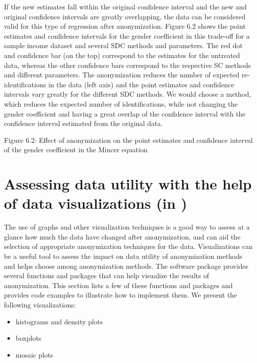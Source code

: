\documentclass[letterpaper,10pt,english]{sphinxmanual}
\begin{document}
If the new estimates fall within the original confidence interval and
the new and original confidence intervals are greatly overlapping, the
data can be considered valid for this type of regression after
anonymization. Figure 6.2 shows the point estimates and confidence
intervals for the gender coefficient in this trade-off for a sample
income dataset and several SDC methods and parameters. The red dot and
confidence bar (on the top) correspond to the estimates for the
untreated data, whereas the other confidence bars correspond to the
respective SC methods and different parameters. The anonymization
reduces the number of expected re-identifications in the data (left
axis) and the point estimates and confidence intervals vary greatly for
the different SDC methods. We would choose a method, which reduces the
expected number of identifications, while not changing the gender
coefficient and having a great overlap of the confidence interval with
the confidence interval estimated from the original data.

\noindent{}

Figure 6.2: Effect of anonymization on the point estimates and
confidence interval of the gender coefficient in the Mincer equation


\section{Assessing data utility with the help of data visualizations (in )}
\label{\detokenize{utility:assessing-data-utility-with-the-help-of-data-visualizations-in-r}}
The use of graphs and other visualization techniques is a good way to
assess at a glance how much the data have changed after anonymization,
and can aid the selection of appropriate anonymization techniques for
the data. Visualizations can be a useful tool to assess the impact on
data utility of anonymization methods and helps choose among
anonymization methods. The software package  provides several
functions and packages that can help visualize the results of
anonymization. This section lists a few of these functions and packages
and provides code examples to illustrate how to implement them. We
present the following visualizations:
\begin{itemize}
\item {} 
histograms and density plots

\item {} 
boxplots

\item {} 
mosaic plots

\end{itemize}
\end{document}
